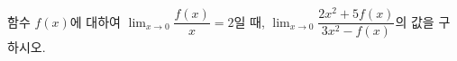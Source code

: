 함수 $f(x)$에 대하여 $\displaystyle\lim_{x\to 0}\dfrac{f(x)}{x}=2$일 때, $\displaystyle\lim_{x\to 0}\dfrac{2x^2+5f(x)}{3x^2-f(x)}$의 값을 구하시오.
